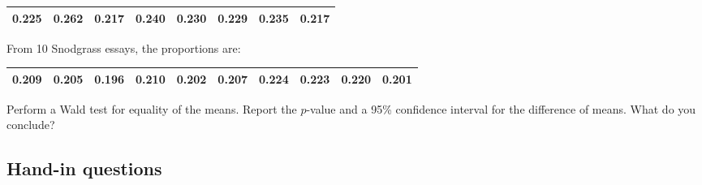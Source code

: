 \documentclass[
]{book}
\theoremstyle{definition}
\theoremstyle{definition}
\theoremstyle{definition}
\theoremstyle{definition}
\theoremstyle{remark}
\begin{document}
\begin{enumerate}
  \begin{longtable}[]{@{}llllllll@{}}
  \toprule
  \endhead
  0.225 & 0.262 & 0.217 & 0.240 & 0.230 & 0.229 & 0.235 & 0.217 \\
  \bottomrule
  \end{longtable}

  From 10 Snodgrass essays, the proportions are:

  \begin{longtable}[]{@{}llllllllll@{}}
  \toprule
  \endhead
  0.209 & 0.205 & 0.196 & 0.210 & 0.202 & 0.207 & 0.224 & 0.223 & 0.220 & 0.201 \\
  \bottomrule
  \end{longtable}

  Perform a Wald test for equality of the means. Report the \(p\)-value and a 95\% confidence interval for the difference of means. What do you conclude?
\end{enumerate}

\hypertarget{hand-in-questions-4}{%
\subsection*{Hand-in questions}\label{hand-in-questions-4}}
\end{document}
